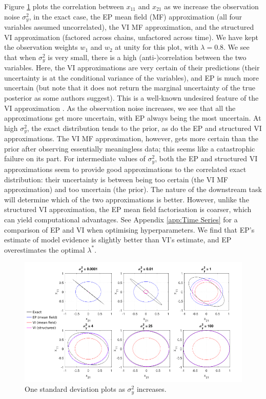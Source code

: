 \documentclass{article}
\begin{document}
Figure \ref{fig:Time series} plots the correlation between $x_{11}$ and $x_{21}$ as we increase the observation noise $\sigma_y^2$, in the exact case, the EP mean field (MF) approximation (all four variables assumed uncorrelated), the VI MF approximation, and the structured VI approximation (factored across chains, unfactored across time). We have kept the observation weights $w_1$ and $w_2$ at unity for this plot, with $\lambda=0.8$. We see that when $\sigma_y^2$ is very small, there is a high \mbox{(anti-)correlation} between the two variables. Here, the VI approximations are very certain of their predictions (their uncertainty is at the conditional variance of the variables), and EP is much more uncertain (but note that it does not return the marginal uncertainty of the true posterior as some authors suggest). This is a well-known undesired feature of the VI approximation \citep{turner_two_2011}. As the observation noise increases, we see that all the approximations get more uncertain, with EP always being the most uncertain. At high $\sigma_y^2$, the exact distribution tends to the prior, as do the EP and structured VI approximations. The VI MF approximation, however, gets more certain than the prior after observing essentially meaningless data; this seems like a catastrophic failure on its part. For intermediate values of $\sigma_y^2$, both the EP and structured VI approximations seem to provide good approximations to the correlated exact distribution: their uncertainty is between being too certain (the VI MF approximation) and too uncertain (the prior). The nature of the downstream task will determine which of the two approximations is better. However, unlike the structured VI approximation, the EP mean field factorisation is coarser, which can yield computational advantages. See Appendix \ref{app:Time Series} for a comparison of EP and VI when optimising hyperparameters. We find that EP's estimate of model evidence is slightly better than VI's estimate, and EP overestimates the optimal $\lambda^*$.
%
\begin{figure}[h]
  \centering
  \includegraphics[scale=0.55]{Precision_plots_wrt_sy.png}
  \caption{One standard deviation plots as $\sigma_y^2$ increases.}
  \label{fig:Time series}
\end{figure}
%
\end{document}

